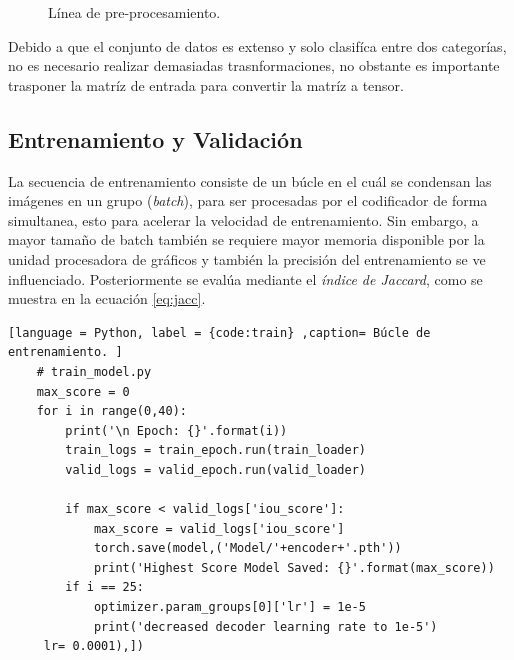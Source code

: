 \begin{figure}[H]
    \centering
    \begin{adjustbox}{width=0.9\linewidth}
    \end{adjustbox}
    \caption{Línea de pre-procesamiento.}
    \label{fig: pipeline}
\end{figure}


Debido a que el conjunto de datos es extenso y solo clasifíca entre dos categorías, no es necesario realizar demasiadas trasnformaciones, no obstante es importante trasponer la matríz de entrada para convertir la matríz a tensor.

\subsection{Entrenamiento y Validación}
La secuencia de entrenamiento consiste de un búcle en el cuál se condensan las imágenes en un grupo (\emph{batch}), para ser procesadas por el codificador de forma simultanea, esto para acelerar la velocidad de entrenamiento. Sin embargo, a mayor tamaño de batch también se requiere mayor memoria disponible por la unidad procesadora de gráficos y también la precisión del entrenamiento se ve influenciado. Posteriormente se evalúa mediante el \emph{índice de Jaccard}, como se muestra en la ecuación \ref{eq:jacc}.

\begin{lstlisting}[language = Python, label = {code:train} ,caption= Búcle de entrenamiento. ]
    # train_model.py
    max_score = 0 
    for i in range(0,40):
        print('\n Epoch: {}'.format(i))
        train_logs = train_epoch.run(train_loader)
        valid_logs = valid_epoch.run(valid_loader)

        if max_score < valid_logs['iou_score']:
            max_score = valid_logs['iou_score']
            torch.save(model,('Model/'+encoder+'.pth'))
            print('Highest Score Model Saved: {}'.format(max_score))
        if i == 25:
            optimizer.param_groups[0]['lr'] = 1e-5
            print('decreased decoder learning rate to 1e-5')
     lr= 0.0001),])
\end{lstlisting}

